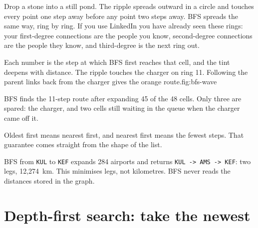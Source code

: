 \begin{analogy}
Drop a stone into a still pond. The ripple spreads outward in a circle and touches every point one step away before any point two steps away. BFS spreads the same way, ring by ring. If you use LinkedIn you have already seen these rings: your first-degree connections are the people you know, second-degree connections are the people they know, and third-degree is the next ring out.
\end{analogy}

\begin{utpfig}{Each number is the step at which BFS first reaches that cell, and the tint deepens with distance. The ripple touches the charger on ring 11. Following the parent links back from the charger gives the orange route.}{fig:bfs-wave}
\end{utpfig}

BFS finds the 11-step route after expanding 45 of the 48 cells. Only three are spared: the charger, and two cells still waiting in the queue when the charger came off it.

\begin{keyidea}
Oldest first means nearest first, and nearest first means the fewest steps. That guarantee comes straight from the shape of the list.
\end{keyidea}

\begin{workedexample}
BFS from \texttt{KUL} to \texttt{KEF} expands 284 airports and returns \texttt{KUL -> AMS -> KEF}: two legs, 12,274~km. This minimises legs, not kilometres. BFS never reads the distances stored in the graph.
\end{workedexample}

\section{Depth-first search: take the newest}

